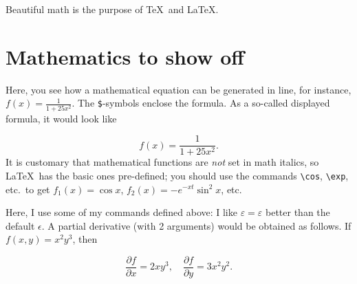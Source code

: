 \def\TheFile{ch03_mathematics.tex}
\newcommand\premathpar{\vspace{-2\parskip}\par}
\begin{savequote}[15cm]
  \vspace{-30mm}
  \raggedleft
  \sffamily
  Beautiful math is the purpose of \TeX\ and \LaTeX.
\end{savequote}
\chapter{Mathematics to show off}
\newcommand{\half}{\frac{1}{2}}
\newcommand{\eps}{\varepsilon}
\newcommand{\rh}{\rho}
\newcommand{\mtheta}{\vartheta}
\newcommand{\ph}{\varphi}
\newcommand{\der}[2]{\frac{\partial {#1}}{\partial {#2}}}

Here, you see how a mathematical equation can be generated in line, for
instance, $f(x) = \frac{1}{1+25 x^2}$.
The \verb+$+-symbols enclose the formula.
As a so-called displayed formula, it would look like\premathpar
\begin{displaymath}
  f(x) = \frac{1}{1+25 x^2}.
\end{displaymath}
It is customary that mathematical functions are \emph{not} set in math italics,
so \LaTeX\ has the basic ones pre-defined; you should use the commands
\verb+\cos+, \verb+\exp+, etc.\ to get $f_1(x) = \cos x$,
$f_2(x) = - e^{-xt} \sin^2 x$, etc.

Here, I use some of my commands defined above: I like $\eps = \varepsilon$
better than the default $\epsilon$. A partial derivative (with 2 arguments)
would be obtained as follows. If $f(x,y) = x^2 y^3$, then \premathpar
\begin{displaymath}
  \der{f}{x} = 2 x y^3, \quad \der{f}{y} = 3 x^2 y^2.
\end{displaymath}
